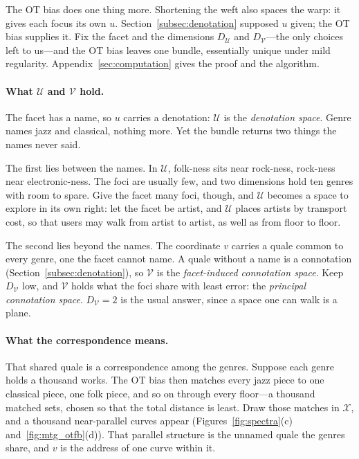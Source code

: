 The OT bias does one thing more. Shortening the weft also spaces the warp: it
gives each focus its own $u$. Section~\ref{subsec:denotation} supposed $u$
given; the OT bias supplies it. Fix the facet and the dimensions
$D_\mathcal{U}$ and $D_\mathcal{V}$---the only choices left to us---and the OT
bias leaves one bundle, essentially unique under mild regularity.
Appendix~\ref{sec:computation} gives the proof and the algorithm.

\paragraph{What $\mathcal{U}$ and $\mathcal{V}$ hold.}
The facet has a name, so $u$ carries a denotation: $\mathcal{U}$ is the
\textit{denotation space}. Genre names jazz and classical, nothing more. Yet
the bundle returns two things the names never said.

The first lies between the names. In $\mathcal{U}$, folk-ness sits near
rock-ness, rock-ness near electronic-ness. The foci are usually few, and two
dimensions hold ten genres with room to spare. Give the facet many foci,
though, and $\mathcal{U}$ becomes a space to explore in its own right: let the
facet be artist, and $\mathcal{U}$ places artists by transport cost, so that
users may walk from artist to artist, as well as from floor to floor.

The second lies beyond the names. The coordinate $v$ carries a quale common
to every genre, one the facet cannot name. A quale without a name is a
connotation (Section~\ref{subsec:denotation}), so $\mathcal{V}$ is the
\textit{facet-induced connotation space}. Keep $D_\mathcal{V}$ low, and
$\mathcal{V}$ holds what the foci share with least error: the
\textit{principal connotation space}. $D_\mathcal{V} = 2$ is the usual
answer, since a space one can walk is a plane.

\paragraph{What the correspondence means.}
That shared quale is a correspondence among the genres. Suppose each genre
holds a thousand works. The OT bias then matches every jazz piece to one
classical piece, one folk piece, and so on through every floor---a thousand
matched sets, chosen so that the total distance is least. Draw those matches in
$\mathcal{X}$, and a thousand near-parallel curves appear
(Figures~\ref{fig:spectra}(c) and~\ref{fig:mtg_otfb}(d)). That parallel
structure is the unnamed quale the genres share, and $v$ is the address of one
curve within it.

